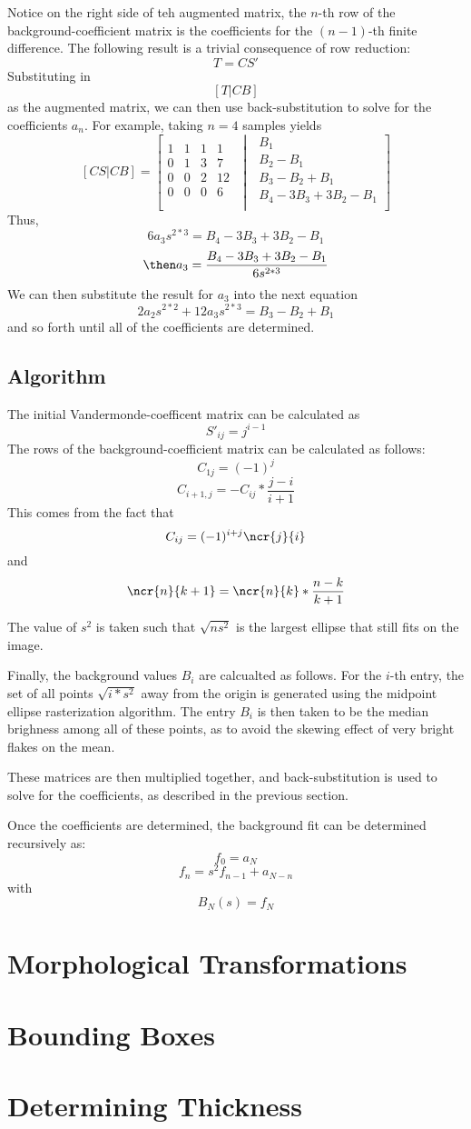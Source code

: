 \documentclass{article}
\begin{document}
Notice on the right side of teh augmented matrix, the \(n\)-th row of the background-coefficient matrix is the coefficients for the \((n-1)\)-th finite difference.
The following result is a trivial consequence of row reduction:
\[T=CS'\]
Substituting in
\[[T|CB]\]
as the augmented matrix, we can then use back-substitution to solve for the coefficients \(a_n\). For example, taking \(n=4\) samples yields
\[
	[CS\vert CB]=\left[\begin{matrix} 1 & 1 & 1 & 1\\
			0 & 1 & 3 & 7\\
			0 & 0 & 2 & 12\\
			0 & 0 & 0 & 6\\
		\end{matrix}
		\,\,\middle\vert\,\,\begin{matrix}
			B_1\\
			B_2-B_1\\
			B_3-B_2+B_1\\
			B_4-3B_3+3B_2-B_1\\
	\end{matrix}\right]
		\]
Thus,
\[6a_3 s^{2*3}= B_4-3B_3+3B_2-B_1\]
\[\then a_3 = \frac{B_4-3B_3+3B_2-B_1}{6s^{2*3}}\]
We can then substitute the result for \(a_3\) into the next equation
\[2a_2 s^{2*2}+12a_3s^{2*3} = B_3-B_2+B_1\]
and so forth until all of the coefficients are determined.

\subsection{Algorithm}
The initial Vandermonde-coefficent matrix can be calculated as
\[S'_{ij}=j^{i-1}\]
The rows of the background-coefficient matrix can be calculated as follows:
\[C_{1j}=(-1)^j\]
\[C_{i+1,j}=-C_{ij}*\frac{j-i}{i+1}\]
This comes from the fact that
\[C_{ij}=(-1)^{i+j}\ncr{j}{i}\]
and
\[\ncr{n}{k+1}=\ncr{n}{k}*\frac{n-k}{k+1}\]

The value of \(s^2\) is taken such that \(\sqrt{ns^2}\) is the largest ellipse that still fits on the image. 

Finally, the background values \(B_i\) are calcualted as follows. For the \(i\)-th entry, the set of all points \(\sqrt{i*s^2}\) away from the origin is generated using the midpoint ellipse rasterization algorithm. The entry \(B_i\) is then taken to be the median brighness among all of these points, as to avoid the skewing effect of very bright flakes on the mean.

These matrices are then multiplied together, and back-substitution is used to solve for the coefficients, as described in the previous section. 

Once the coefficients are determined, the background fit can be determined recursively as:
\[f_0=a_N\]
\[f_{n} =s^2f_{n-1} +a_{N-n}\]
with
\[B_N(s)=f_N\]


\section{Morphological Transformations}
\section{Bounding Boxes}
\section{Determining Thickness}
\end{document}
